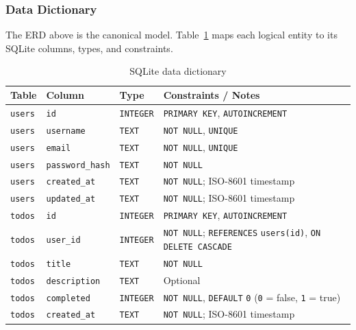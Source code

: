 \newpage

\subsubsection{Data Dictionary}
The ERD above is the canonical model. Table~\ref{tab:data-dictionary} maps each logical
entity to its SQLite columns, types, and constraints.

\begin{table}[htbp]
  \centering
  \caption{SQLite data dictionary}
  \label{tab:data-dictionary}
  \small
  \begin{tabularx}{\textwidth}{@{} l l l X @{}}
    \toprule
    \textbf{Table} & \textbf{Column} & \textbf{Type} & \textbf{Constraints / Notes} \\
    \midrule
    \texttt{users} & \texttt{id}             & \texttt{INTEGER} & \texttt{PRIMARY KEY}, \texttt{AUTOINCREMENT} \\
    \texttt{users} & \texttt{username}       & \texttt{TEXT}    & \texttt{NOT NULL}, \texttt{UNIQUE} \\
    \texttt{users} & \texttt{email}          & \texttt{TEXT}    & \texttt{NOT NULL}, \texttt{UNIQUE} \\
    \texttt{users} & \texttt{password\_hash} & \texttt{TEXT}    & \texttt{NOT NULL} \\
    \texttt{users} & \texttt{created\_at}    & \texttt{TEXT}    & \texttt{NOT NULL}; ISO-8601 timestamp \\
    \texttt{users} & \texttt{updated\_at}    & \texttt{TEXT}    & \texttt{NOT NULL}; ISO-8601 timestamp \\
    \midrule
    \texttt{todos} & \texttt{id}             & \texttt{INTEGER} & \texttt{PRIMARY KEY}, \texttt{AUTOINCREMENT} \\
    \texttt{todos} & \texttt{user\_id}       & \texttt{INTEGER} & \texttt{NOT NULL}; \texttt{REFERENCES} \texttt{users(id)}, \texttt{ON DELETE CASCADE} \\
    \texttt{todos} & \texttt{title}          & \texttt{TEXT}    & \texttt{NOT NULL} \\
    \texttt{todos} & \texttt{description}    & \texttt{TEXT}    & Optional \\
    \texttt{todos} & \texttt{completed}      & \texttt{INTEGER} & \texttt{NOT NULL}, \texttt{DEFAULT} \texttt{0} (\texttt{0} = false, \texttt{1} = true) \\
    \texttt{todos} & \texttt{created\_at}    & \texttt{TEXT}    & \texttt{NOT NULL}; ISO-8601 timestamp \\

\end{tabularx}
\end{table}
